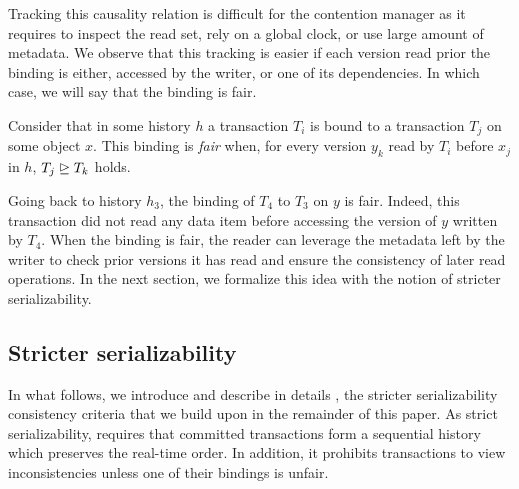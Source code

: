Tracking this causality relation is difficult for the contention manager as it requires to inspect the read set, rely on a global clock, or use large amount of metadata.
We observe that this tracking is easier if each version read prior the binding is either, accessed by the writer, or one of its dependencies.
In which case, we will say that the binding is fair.

\begin{definition}
  Consider that in some history $h$ a transaction $T_i$ is bound to a transaction $T_j$ on some object $x$.
  This binding is \emph{fair} when, for every version $y_k$ read by $T_i$ before $x_j$ in $h$, $T_j \mathrel{\unrhd} T_k$ holds.
\end{definition}

Going back to history $h_3$, the binding of $T_4$ to $T_3$ on $y$ is fair.
Indeed, this transaction did not read any data item before accessing the version of $y$ written by $T_4$.
When the binding is fair, the reader can leverage the metadata left by the writer to check prior versions it has read and ensure the consistency of later read operations.
In the next section, we formalize this idea with the notion of stricter serializability.

\subsection{Stricter serializability}
In what follows, we introduce and describe in details \SPSER, the stricter serializability consistency criteria that we build upon in the remainder of this paper.
As strict serializability, \SPSER requires that committed transactions form a sequential history which preserves the real-time order.
In addition, it prohibits transactions to view inconsistencies unless one of their bindings is unfair.

